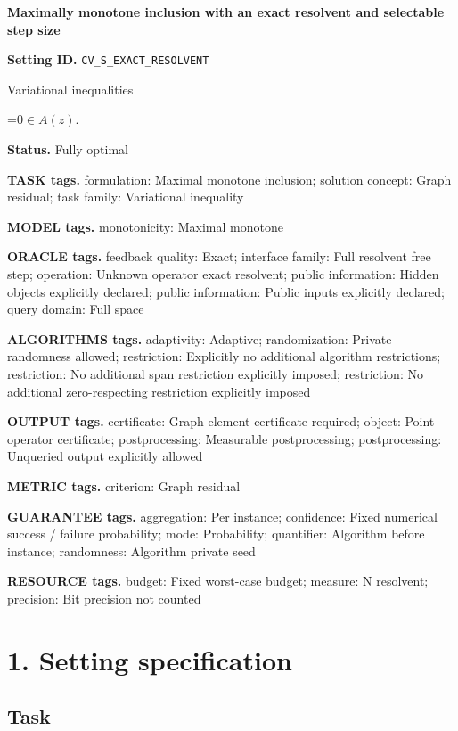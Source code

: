 \documentclass[10pt,a4paper]{article}
\newcommand{\AtlasMath}[1]{\par\begingroup\centering\setbox0=\hbox{$\displaystyle #1$}\ifdim\wd0>1.4\linewidth\typeout{ATLAS WIDE FORMULA: \the\wd0}\fi\ifdim\wd0>\linewidth\resizebox{\linewidth}{!}{\box0}\else\box0\fi\par\endgroup}
\begin{document}
\raggedright

{\LARGE\bfseries\sffamily\color{AtlasNavy} Maximally monotone inclusion with an exact resolvent and selectable step size\par}\vspace{5pt}
\textbf{Setting ID.} \texttt{CV\_\allowbreak{}S\_\allowbreak{}EXACT\_\allowbreak{}RESOLVENT}

Variational inequalities


\AtlasMath{0\in A(z).}


\textbf{Status.} Fully optimal

\textbf{TASK tags.} formulation: Maximal monotone inclusion; solution concept: Graph residual; task family: Variational inequality

\textbf{MODEL tags.} monotonicity: Maximal monotone

\textbf{ORACLE tags.} feedback quality: Exact; interface family: Full resolvent free step; operation: Unknown operator exact resolvent; public information: Hidden objects explicitly declared; public information: Public inputs explicitly declared; query domain: Full space

\textbf{ALGORITHMS tags.} adaptivity: Adaptive; randomization: Private randomness allowed; restriction: Explicitly no additional algorithm restrictions; restriction: No additional span restriction explicitly imposed; restriction: No additional zero-respecting restriction explicitly imposed

\textbf{OUTPUT tags.} certificate: Graph-element certificate required; object: Point operator certificate; postprocessing: Measurable postprocessing; postprocessing: Unqueried output explicitly allowed

\textbf{METRIC tags.} criterion: Graph residual

\textbf{GUARANTEE tags.} aggregation: Per instance; confidence: Fixed numerical success / failure probability; mode: Probability; quantifier: Algorithm before instance; randomness: Algorithm private seed

\textbf{RESOURCE tags.} budget: Fixed worst-case budget; measure: N resolvent; precision: Bit precision not counted

\section{1. Setting specification}
\subsection{Task}
\end{document}
